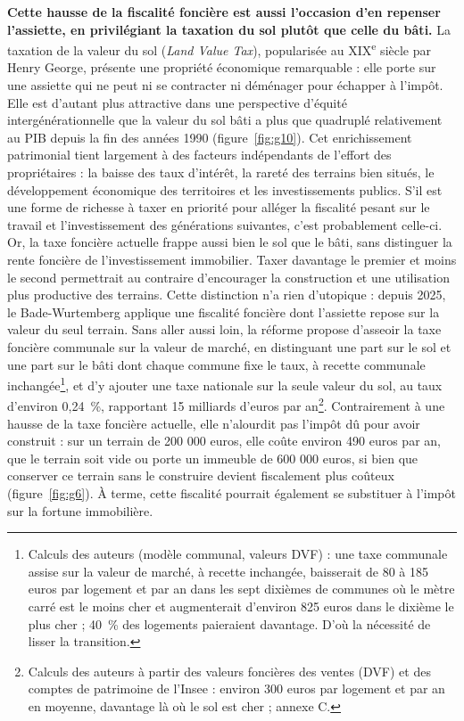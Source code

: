 \documentclass[10pt,a4paper]{article}
\begin{document}
\textbf{Cette hausse de la fiscalité foncière est aussi l’occasion d’en repenser l’assiette, en privilégiant la taxation du sol plutôt que celle du bâti.} La taxation de la valeur du sol (\emph{Land Value Tax}), popularisée au XIX\textsuperscript{e} siècle par Henry George, présente une propriété économique remarquable : elle porte sur une assiette qui ne peut ni se contracter ni déménager pour échapper à l’impôt. Elle est d’autant plus attractive dans une perspective d’équité intergénérationnelle que la valeur du sol bâti a plus que quadruplé relativement au PIB depuis la fin des années 1990 (figure~\ref{fig:g10}). Cet enrichissement patrimonial tient largement à des facteurs indépendants de l’effort des propriétaires : la baisse des taux d’intérêt, la rareté des terrains bien situés, le développement économique des territoires et les investissements publics. S’il est une forme de richesse à taxer en priorité pour alléger la fiscalité pesant sur le travail et l’investissement des générations suivantes, c’est probablement celle-ci. Or, la taxe foncière actuelle frappe aussi bien le sol que le bâti, sans distinguer la rente foncière de l’investissement immobilier. Taxer davantage le premier et moins le second permettrait au contraire d’encourager la construction et une utilisation plus productive des terrains. Cette distinction n’a rien d’utopique : depuis 2025, le Bade-Wurtemberg applique une fiscalité foncière dont l’assiette repose sur la valeur du seul terrain. Sans aller aussi loin, la réforme propose d’asseoir la taxe foncière communale sur la valeur de marché, en distinguant une part sur le sol et une part sur le bâti dont chaque commune fixe le taux, à recette communale inchangée\footnote{Calculs des auteurs (modèle communal, valeurs DVF) : une taxe communale assise sur la valeur de marché, à recette inchangée, baisserait de 80 à 185 euros par logement et par an dans les sept dixièmes de communes où le mètre carré est le moins cher et augmenterait d’environ 825 euros dans le dixième le plus cher ; 40~\% des logements paieraient davantage. D’où la nécessité de lisser la transition.}, et d’y ajouter une taxe nationale sur la seule valeur du sol, au taux d’environ 0,24~\%, rapportant 15 milliards d’euros par an\footnote{Calculs des auteurs à partir des valeurs foncières des ventes (DVF) et des comptes de patrimoine de l'Insee : environ 300 euros par logement et par an en moyenne, davantage là où le sol est cher ; annexe C.}. Contrairement à une hausse de la taxe foncière actuelle, elle n’alourdit pas l’impôt dû pour avoir construit : sur un terrain de 200 000 euros, elle coûte environ 490 euros par an, que le terrain soit vide ou porte un immeuble de 600 000 euros, si bien que conserver ce terrain sans le construire devient fiscalement plus coûteux (figure~\ref{fig:g6}). À terme, cette fiscalité pourrait également se substituer à l’impôt sur la fortune immobilière.
\end{document}
